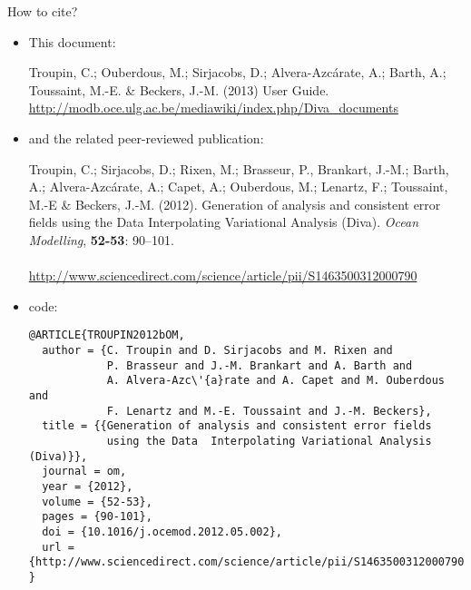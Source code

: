 \newpage

\vspace*{\fill}

\begin{center}
\begin{minipage}[c]{.85\textwidth}
\Large{How to cite?}
\vspace{1cm}
\normalsize


\begin{itemize}
\item This document:


Troupin, C.; Ouberdous, M.; Sirjacobs, D.; Alvera-Azcárate, A.; Barth, A.; Toussaint, M.-E. \& Beckers, J.-M. (2013) \diva User Guide.\\
\url{http://modb.oce.ulg.ac.be/mediawiki/index.php/Diva_documents}


\item and the related peer-reviewed publication:


Troupin, C.; Sirjacobs, D.; Rixen, M.; Brasseur, P., Brankart, J.-M.; Barth,
A.; Alvera-Azc\'{a}rate, A.; Capet, A.; Ouberdous, M.; Lenartz, F.;
Toussaint, M.-E \& Beckers, J.-M. (2012).
Generation of analysis and consistent error fields using the Data
Interpolating Variational Analysis (Diva).
\emph{Ocean Modelling}, \textbf{52-53}: 90--101.\\
\\
\url{http://www.sciencedirect.com/science/article/pii/S1463500312000790}

\item[]

{\scriptsize
\BibTeX code:
\begin{verbatim}
@ARTICLE{TROUPIN2012bOM,
  author = {C. Troupin and D. Sirjacobs and M. Rixen and 
            P. Brasseur and J.-M. Brankart and A. Barth and 
            A. Alvera-Azc\'{a}rate and A. Capet and M. Ouberdous and 
            F. Lenartz and M.-E. Toussaint and J.-M. Beckers},
  title = {{Generation of analysis and consistent error fields 
            using the Data 	Interpolating Variational Analysis (Diva)}},
  journal = om,
  year = {2012},
  volume = {52-53},
  pages = {90-101},
  doi = {10.1016/j.ocemod.2012.05.002},
  url = {http://www.sciencedirect.com/science/article/pii/S1463500312000790}
}
\end{verbatim}
}

\end{itemize}


\vspace{.25cm}
\end{minipage}

\end{center}

\vspace*{\fill}

